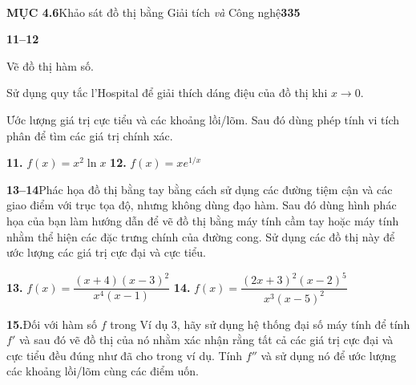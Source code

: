 \documentclass[10pt,a4paper]{article}
\newcommand{\casicon}{%
  \tikz[baseline=-0.6ex]{%
    \node[draw=stewartblue, rounded corners=0.5pt, line width=0.6pt, inner sep=0.8pt, text=stewartblue, font=\sffamily\bfseries\fontsize{6.5pt}{7pt}\selectfont, minimum size=8.5pt] {T};%
  }%
}
\newcommand{\exercisedivider}{\par\vspace{4pt}{\color{stewartblue!60}\hrule height 0.45pt}\vspace{4pt}}
\begin{document}
\fontsize{8.7pt}{11pt}\selectfont

\noindent
\begin{minipage}[b]{0.485\textwidth}
  ~ \vspace{0.1pt}
\end{minipage}\hfill
\begin{minipage}[b]{0.485\textwidth}
  \raggedleft\small\textsf{\textbf{MỤC 4.6}\hspace{1.5em}Khảo sát đồ thị bằng Giải tích \textit{và} Công nghệ\hspace{2.5em}\textbf{335}}
\end{minipage}
\vspace{1.2em}

\noindent
\begin{minipage}[t]{0.485\textwidth}
  \noindent\textbf{\color{stewartblue}11--12}
  \begin{exsubparts}
    \item Vẽ đồ thị hàm số.
    \item Sử dụng quy tắc l'Hospital để giải thích dáng điệu của đồ thị khi $x \to 0$.
    \item Ước lượng giá trị cực tiểu và các khoảng lồi/lõm. Sau đó dùng phép tính vi tích phân để tìm các giá trị chính xác.
  \end{exsubparts}
  \vspace{2pt}
  \noindent\textbf{11.}\;\; $f(x) = x^2 \ln x$ \hfill \textbf{12.}\;\; $f(x) = x e^{1/x}$

  \exercisedivider

  \noindent\textbf{\color{stewartblue}13--14}\quad Phác họa đồ thị bằng tay bằng cách sử dụng các đường tiệm cận và các giao điểm với trục tọa độ, nhưng không dùng đạo hàm. Sau đó dùng hình phác họa của bạn làm hướng dẫn để vẽ đồ thị bằng máy tính cầm tay hoặc máy tính nhằm thể hiện các đặc trưng chính của đường cong. Sử dụng các đồ thị này để ước lượng các giá trị cực đại và cực tiểu.
  \vspace{4pt}

  \noindent\textbf{13.}\;\; $f(x) = \dfrac{(x + 4)(x - 3)^2}{x^4(x - 1)}$ \hfill \textbf{14.}\;\; $f(x) = \dfrac{(2x + 3)^2(x - 2)^5}{x^3(x - 5)^2}$

  \exercisedivider

  \noindent\makebox[0pt][r]{\casicon\hspace{3pt}}\textbf{15.}\quad Đối với hàm số $f$ trong Ví dụ 3, hãy sử dụng hệ thống đại số máy tính để tính $f'$ và sau đó vẽ đồ thị của nó nhằm xác nhận rằng tất cả các giá trị cực đại và cực tiểu đều đúng như đã cho trong ví dụ. Tính $f''$ và sử dụng nó để ước lượng các khoảng lồi/lõm cùng các điểm uốn.
  \vspace{3pt}


\end{minipage}
\end{document}
